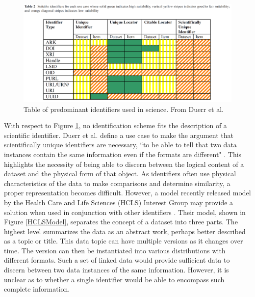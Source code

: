 \begin{figure}
	\centering
	\includegraphics[scale=0.30]{figures/DigitalIdentifierTable.png}
	\caption{Table of predominant identifiers used in science.  From Duerr et al. \cite{Duerr2011}}
	\label{table:Duerr}
\end{figure}

With respect to Figure \ref{table:Duerr}, no identification scheme fits the description of a scientific identifier.
Duerr et al. define a use case to make the argument that scientifically unique identifiers are necessary, ``to be able to tell that two data instances contain the same information even if the formats are different" \cite{Duerr2011}.
This highlights the necessity of being able to discern between the logical content of a dataset and the physical form of that object.
As identifiers often use physical characteristics of the data to make comparisons and determine similarity, a proper representation becomes difficult.
However, a model recently released model by the Health Care and Life Sciences (HCLS) Interest Group may provide a solution when used in conjunction with other identifiers \cite{Dummontier2016}.
Their model, shown in Figure \ref{HCLSModel}, separates the concept of a dataset into three parts.
The highest level summarizes the data as an abstract work, perhaps better described as a topic or title.
This data topic can have multiple versions as it changes over time.
The version can then be instantiated into various distributions with different formats.
Such a set of linked data would provide sufficient data to discern between two data instances of the same information.
However, it is unclear as to whether a single identifier would be able to encompass such complete information.

